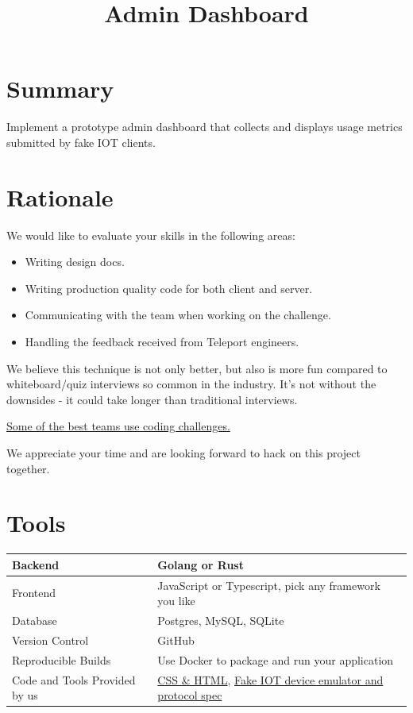 \documentclass{article}
\begin{document}
 
\title{Admin Dashboard}

\section{Summary}
 
Implement a prototype admin dashboard that collects and displays usage metrics submitted
by fake IOT clients.

\section{Rationale}

We would like to evaluate your skills in the following areas:

\begin{itemize} %
  \item Writing design docs.
  \item Writing production quality code for both client and server.
  \item Communicating with the team when working on the challenge.
  \item Handling the feedback received from Teleport engineers.
\end{itemize}

We believe this technique is not only better, but also is more fun compared to whiteboard/quiz interviews so common in the industry. It's not without the downsides - it could take longer than traditional interviews.

\par

\href{https://sockpuppet.org/blog/2015/03/06/the-hiring-post/}{Some of the best teams use coding challenges.}

We appreciate your time and are looking forward to hack on this project together.

\section{Tools}

\begin{center}
\begin{tabular}{ | m{15em} | m{15em}| }
  \hline
  Backend & Golang or Rust \\
  \hline
  Frontend & JavaScript or Typescript, pick any framework you like \\
  \hline
  Database & Postgres, MySQL, SQLite \\
  \hline
  Version Control & GitHub \\
  \hline
  Reproducible Builds & Use Docker to package and run your application \\
  \hline
  Code and Tools Provided by us & \href{https://github.com/gravitational/challenge-user-management}{CSS \& HTML}, \href{https://github.com/gravitational/fakeiot}{Fake IOT device emulator and protocol spec} \\
  \hline
  \end{tabular}
\end{center}
\end{document}
